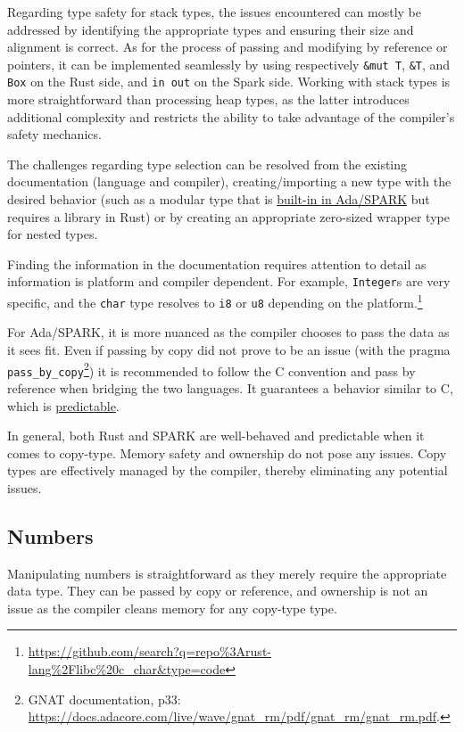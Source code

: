 \documentclass[nomenclature, english, bibtex]{kththesis}
\begin{document}
Regarding type safety for stack types, the issues encountered can mostly be addressed by identifying the appropriate types and ensuring their size and alignment is correct. As for the process of passing and modifying by reference or pointers, it can be implemented seamlessly by using respectively \texttt{\&mut T}, \texttt{\&T}, and \texttt{Box} on the Rust side, and \texttt{in out} on the Spark side. Working with stack types is more straightforward than processing heap types, as the latter introduces additional complexity and restricts the ability to take advantage of the compiler's safety mechanics.

The challenges regarding type selection can be resolved from the existing documentation (language and compiler), creating/importing a new type with the desired behavior (such as a modular type that is \href{https://ada-lang.io/docs/arm/AA-3/AA-3.5#354--integer-types}{built-in in Ada/SPARK} but requires a library in Rust) or by creating an appropriate zero-sized wrapper type for nested types. 

Finding the information in the documentation requires attention to detail as information is platform and compiler dependent. For example, \texttt{Integer}s are very specific, and the \texttt{char} type resolves to \texttt{i8} or \texttt{u8} depending on the platform.\footnote{\url{https://github.com/search?q=repo\%3Arust-lang\%2Flibc\%20c_char&type=code}}


For Ada/SPARK, it is more nuanced as the compiler chooses to pass the data as it sees fit. Even if passing by copy did not prove to be an issue (with the pragma \texttt{pass\_by\_copy}\footnote{GNAT documentation, p33: 
\url{https://docs.adacore.com/live/wave/gnat_rm/pdf/gnat_rm/gnat_rm.pdf}.}) it is recommended to follow the C convention and pass by reference when bridging the two languages. It guarantees a behavior similar to C, which is \href{https://en.wikibooks.org/wiki/Ada_Programming/Types/access}{predictable}.

In general, both Rust and SPARK are well-behaved and predictable when it comes to \gls{copy-type}.
Memory safety and ownership do not pose any issues. Copy types are effectively managed by the compiler, thereby eliminating any potential issues. 


\subsection{Numbers}
\label{sec:numbers}
Manipulating numbers is straightforward as they merely require the appropriate data type. They can be passed by copy or reference, and ownership is not an issue as the compiler cleans memory for any \gls{copy-type} type.
\end{document}
